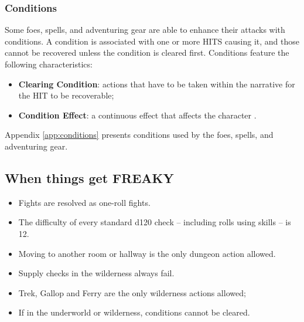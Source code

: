 \subsubsection{Conditions}
Some foes, spells, and adventuring gear are able to enhance their attacks with conditions. A condition is associated with one or more HITS causing it, and those cannot be recovered unless the condition is cleared first. Conditions feature the following characteristics:
\begin{itemize}
    \item {\textbf{Clearing Condition}: actions that have to be taken within the narrative for the HIT to be recoverable;}
    \item {\textbf{Condition Effect}: a continuous effect that affects the character .}
\end{itemize}

Appendix \ref{app:conditions} presents conditions used by the foes, spells, and adventuring gear.

\subsection{When things get FREAKY}
\begin{itemize}
    \item {Fights are resolved as one-roll fights.}
    \item {The difficulty of every standard d120 check -- including rolls using skills -- is 12.}
    \item {Moving to another room or hallway is the only dungeon action allowed.}
    \item {Supply checks in the wilderness always fail.}
    \item {Trek, Gallop and Ferry are the only wilderness actions allowed;}
    \item {If in the underworld or wilderness, conditions cannot be cleared.}
\end{itemize}

